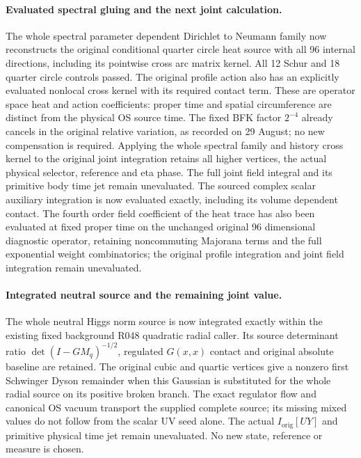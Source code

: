 \paragraph{Evaluated spectral gluing and the next joint calculation.}
The whole spectral parameter dependent Dirichlet to Neumann family now
reconstructs the original conditional quarter circle heat source with
all 96 internal directions, including its pointwise cross arc matrix
kernel. All 12 Schur and 18 quarter circle controls passed. The original
profile action also has an explicitly evaluated nonlocal cross kernel
with its required contact term. These are operator space heat and action
coefficients: proper time and spatial circumference are distinct from
the physical OS source time. The fixed BFK factor \(2^{-4}\) already
cancels in the original relative variation, as recorded on 29 August;
no new compensation is required. Applying the whole spectral family
and history cross kernel to the original joint integration retains all
higher vertices, the actual physical selector, reference and eta phase.
The full joint field integral and its primitive body time jet remain
unevaluated.
The sourced complex scalar auxiliary integration is now evaluated
exactly, including its volume dependent contact.
The fourth order field coefficient of the heat trace has also been evaluated
at fixed proper time on the unchanged original 96 dimensional diagnostic
operator, retaining noncommuting Majorana terms and the full exponential
weight combinatorics; the original profile integration and joint field
integration remain unevaluated.

\paragraph{Integrated neutral source and the remaining joint value.}
The whole neutral Higgs norm source is now integrated exactly within
the existing fixed background R048 quadratic radial caller.
Its source determinant ratio \(\det(I-GM_q)^{-1/2}\), regulated
\(G(x,x)\) contact and original absolute baseline are retained.
The original cubic and quartic vertices give a nonzero first
Schwinger Dyson remainder when this Gaussian is substituted for the
whole radial source on its positive broken branch.
The exact regulator flow and canonical OS vacuum transport the supplied
complete source; its missing mixed values do not follow from the scalar
UV seed alone. The actual \(I_{\mathrm{orig}}[UY]\) and primitive physical
time jet remain unevaluated. No new state, reference or measure is chosen.

